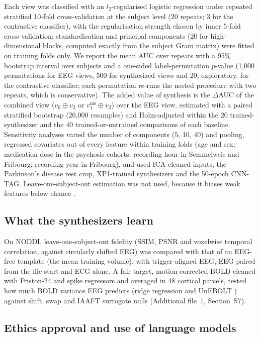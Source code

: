 \documentclass[pdflatex,referee,sn-basic]{sn-jnl}%
\begin{document}
Each view was classified with an $l_2$-regularised logistic regression \cite{treviso2020explanation} under repeated stratified 10-fold cross-validation at the subject level (20 repeats; 3 for the contrastive classifier), with the regularisation strength chosen by inner 5-fold cross-validation; standardisation and principal components (20 for high-dimensional blocks, computed exactly from the subject Gram matrix) were fitted on training folds only. We report the mean AUC over repeats with a 95\% bootstrap interval over subjects and a one-sided label-permutation $p$-value (1,000 permutations for EEG views, 500 for synthesized views and 20, exploratory, for the contrastive classifier; each permutation re-runs the nested procedure with two repeats, which is conservative). The added value of synthesis is the $\Delta$AUC of the combined view ($v_0\oplus v_2$ or $v_1^{\mathrm{ms}}\oplus v_2$) over the EEG view, estimated with a paired stratified bootstrap (20,000 resamples) and Holm-adjusted within the 20 trained-synthesizer and the 40 trained-or-untrained comparisons of each baseline. Sensitivity analyses varied the number of components (5, 10, 40) and pooling, regressed covariates out of every feature within training folds (age and sex; medication dose in the psychosis cohorts; recording hour in Semmelweis and Fribourg; recording year in Fribourg), and used ICA-cleaned inputs, the Parkinson's disease rest crop, XP1-trained synthesizers and the 50-epoch CNN-TAG. Leave-one-subject-out estimation was not used, because it biases weak features below chance \cite{varoquaux2018}.

\subsection{What the synthesizers learn}\label{setting:fidelity}

On NODDI, leave-one-subject-out fidelity (SSIM, PSNR and voxelwise temporal correlation, against circularly shifted EEG) was compared with that of an EEG-free template (the mean training volume), with trigger-aligned EEG, EEG paired from the file start and ECG alone. A fair target, motion-corrected BOLD cleaned with Friston-24 and spike regressors \cite{friston1996,power2014} and averaged in 48 cortical parcels, tested how much BOLD variance EEG predicts (ridge regression and UnEBOLT \cite{li2026unebolt,jiang2024labram}) against shift, swap and IAAFT surrogate nulls \cite{schreiber1996,mehta2025time} (Additional file~1, Section~S7).

\subsection{Ethics approval and use of language models}\label{section:ethics}
\end{document}
